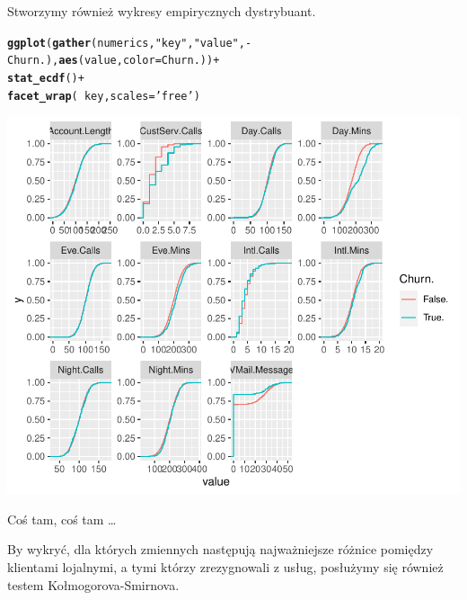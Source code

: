 \documentclass{article}\usepackage[]{graphicx}\usepackage[]{color}
\makeatletter
\def\maxwidth{ %
  \ifdim\Gin@nat@width>\linewidth
    \linewidth
  \else
    \Gin@nat@width
  \fi
}
\newcommand{\hlstr}[1]{\textcolor[rgb]{0.192,0.494,0.8}{#1}}%
\newcommand{\hlopt}[1]{\textcolor[rgb]{0,0,0}{#1}}%
\newcommand{\hlstd}[1]{\textcolor[rgb]{0.345,0.345,0.345}{#1}}%
\newcommand{\hlkwc}[1]{\textcolor[rgb]{0.333,0.667,0.333}{#1}}%
\newcommand{\hlkwd}[1]{\textcolor[rgb]{0.737,0.353,0.396}{\textbf{#1}}}%
\newenvironment{kframe}{%
 \def\at@end@of@kframe{}%
 \ifinner\ifhmode%
  \def\at@end@of@kframe{\end{minipage}}%
  \begin{minipage}{\columnwidth}%
 \fi\fi%
 \def\FrameCommand##1{\hskip\@totalleftmargin \hskip-\fboxsep
 \colorbox{shadecolor}{##1}\hskip-\fboxsep
     \hskip-\linewidth \hskip-\@totalleftmargin \hskip\columnwidth}%
 \MakeFramed {\advance\hsize-\width
   \@totalleftmargin\z@ \linewidth\hsize
   \@setminipage}}%
 {\par\unskip\endMakeFramed%
 \at@end@of@kframe}
\newenvironment{knitrout}{}{} %
\makeatother
\begin{document}
Stworzymy również wykresy empirycznych dystrybuant.
\begin{knitrout}
\color{fgcolor}\begin{kframe}
\begin{alltt}
\hlkwd{ggplot}\hlstd{(}\hlkwd{gather}\hlstd{(numerics,} \hlstr{"key"}\hlstd{,} \hlstr{"value"}\hlstd{,} \hlopt{-}\hlstd{Churn.),} \hlkwd{aes}\hlstd{(value,} \hlkwc{color}\hlstd{=Churn.))} \hlopt{+}
  \hlkwd{stat_ecdf}\hlstd{()} \hlopt{+}
  \hlkwd{facet_wrap}\hlstd{(}\hlopt{~}\hlstd{key,} \hlkwc{scales}\hlstd{=}\hlstr{'free'}\hlstd{)}
\end{alltt}
\end{kframe}

{\centering \includegraphics[width=\maxwidth]{figure/Dystrybuanty_empiryczne-1} 

}



\end{knitrout}
Coś tam, coś tam \ldots

By wykryć, dla których zmiennych następują najważniejsze różnice pomiędzy klientami lojalnymi, a tymi którzy zrezygnowali z usług, posłużymy się również testem Kołmogorova-Smirnova.
\end{document}
